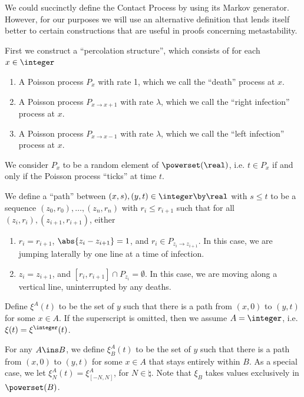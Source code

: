 \documentclass{scrartcl}
\begin{document}
We could succinctly define the Contact Process by using its Markov generator. However, for our purposes we will use
an alternative definition that lends itself better to certain constructions that are useful in proofs concerning metastability.

First we construct a ``percolation structure'', which consists of for each $x \in \integer$
\begin{enumerate}
  \item A Poisson process $P_{x}$ with rate 1, which we call the ``death'' process at $x$.
  \item A Poisson process $P_{x \to x+1}$ with rate $\lambda$, which we call the ``right infection'' process at $x$.
  \item A Poisson process $P_{x \to x-1}$ with rate $\lambda$, which we call the ``left infection'' process at $x$.
\end{enumerate}

We consider $P_{x}$ to be a random element of $\powerset(\real)$, i.e. $t \in P_{x}$ if and only if the Poisson process ``ticks'' at time $t$.


We define a ``path'' between $(x,s), (y,t) \in \integer \by \real$ with $s \leq t$ to be a sequence
$(z_{0},r_{0}), \ldots, (z_{n},r_{n})$ with $r_{i} \leq r_{i+1}$ such that for all $(z_{i},r_{i}),(z_{i+1},r_{i+1})$, either
\begin{enumerate}
  \item $r_{i} = r_{i+1}$, $\abs{z_{i} - z_{i+1}} = 1$, and $r_{i} \in P_{z_{i} \to z_{i+1}}$. In this case, we are jumping laterally by one line at a time of infection.
  \item $z_{i} = z_{i+1}$, and $[r_{i},r_{i+1}] \cap P_{z_{i}} = \emptyset$. In this case, we are moving along a vertical line, uninterrupted by any deaths.
\end{enumerate}

Define $\xi^{A}(t)$ to be the set of $y$ such that there is a path from $(x,0)$ to $(y,t)$ for some $x \in A$. If the superscript is omitted, then we assume $A = \integer$, i.e. $\xi(t) = \xi^{\integer}(t)$.

For any $A \ins B$, we define $\xi_{B}^{A}(t)$ to be the set of $y$ such that there is a path from $(x,0)$ to $(y,t)$ for some $x \in A$ that stays entirely within $B$. As a special case, we let $\xi_{N}^{A}(t) = \xi_{[-N,N]}^{A}$, for $N \in \natural$. Note that $\xi_{B}$ takes values exclusively in $\powerset(B)$.
\end{document}

